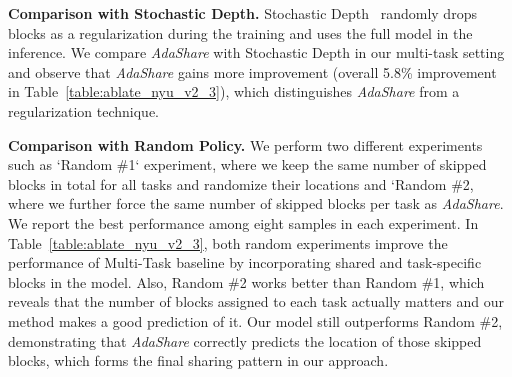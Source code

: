 \textbf{Comparison with Stochastic Depth.} Stochastic Depth~\cite{huang2016deep} randomly drops blocks as a regularization during the training and uses the full model in the inference. 
We compare \textit{AdaShare} with Stochastic Depth in our multi-task setting and observe that \textit{AdaShare} gains more improvement (overall 5.8\% improvement in Table~\ref{table:ablate_nyu_v2_3}), which distinguishes \textit{AdaShare} from a regularization technique.

\textbf{Comparison with Random Policy.}\label{sec:ablation_random}
We perform two different experiments such as `Random \#1` experiment, where we keep the same number of skipped blocks in total for all tasks and randomize their locations and `Random \#2, where we further force the same number of skipped blocks per task as \textit{AdaShare}.
We report the best performance among eight samples in each experiment. 
In Table~\ref{table:ablate_nyu_v2_3}, both random experiments improve the performance of Multi-Task baseline by incorporating shared and task-specific blocks in the model. Also, Random \#2 works better than Random \#1, which reveals that the number of blocks assigned to each task actually matters and our method makes a good prediction of it. Our model still outperforms Random \#2, demonstrating that \textit{AdaShare} correctly predicts the location of those skipped blocks, which forms the final sharing pattern in our approach.

